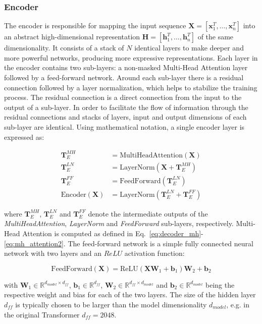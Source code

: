 \subsubsection{Encoder}
The encoder is responsible for mapping the input sequence $\bm{X} = [\bm{x}_1^T,
\ldots, \bm{x}_n^T]$ into an abstract high-dimensional representation $\bm{H} =
[\bm{h}_1^T, \ldots, \bm{h}_n^T]$ of the same dimensionality. It consists of a
stack of $N$ identical layers to make deeper and more powerful networks,
producing more expressive representations. Each layer in the encoder contains
two sub-layers: a non-masked Multi-Head Attention layer followed by a
feed-forward network. Around each sub-layer there is a residual connection
followed by a layer normalization, which helps to stabilize the training
process. The residual connection is a direct connection from the input to the
output of a sub-layer. In order to facilitate the flow of information through
the residual connections and stacks of layers, input and output dimensions of
each sub-layer are identical. Using mathematical notation, a single encoder
layer is expressed as:

\begin{align}
    \label{eq:encoder1}
    \bm{T}_E^{MH} &= \text{MultiHeadAttention}(\bm{X}) \\    
    \bm{T}_E^{LN} &= \text{LayerNorm}(\bm{X} + \bm{T}_E^{MH}) \\
    \bm{T}_E^{FF} &= \text{FeedForward}(\bm{T}_E^{LN}) \\
    \label{eq:encoder2}
    \text{Encoder}(\bm{X}) &= \text{LayerNorm}(\bm{T}_E^{LN} + \bm{T}_E^{FF})
\end{align}

where $\bm{T}_E^{MH}$, $\bm{T}_E^{LN}$ and $\bm{T}_E^{FF}$ denote the
intermediate outputs of the \textit{MultiHeadAttention}, \textit{LayerNorm} and
\textit{FeedForward} sub-layers, respectively. Multi-Head Attention is computed
as defined in Eq.~\ref{eq:decoder_mh}-\ref{eq:mh_attention2}. The feed-forward
network is a simple fully connected neural network with two layers and an $ReLU$
activation function:

\begin{equation}
    \text{FeedForward}(\bm{X}) = \text{ReLU}(\bm{X} \bm{W}_1 + \bm{b}_1) \bm{W}_2 + \bm{b}_2
\end{equation}

with $\bm{W}_1 \in \mathbb{R}^{d_{model} \times d_{ff}}$, $\bm{b}_1 \in
\mathbb{R}^{d_{ff}}$, $\bm{W}_2 \in \mathbb{R}^{d_{ff} \times d_{model}}$ and
$\bm{b}_2 \in \mathbb{R}^{d_{model}}$ being the respective weight and bias for
each of the two layers. The size of the hidden layer $d_{ff}$ is typically
chosen to be larger than the model dimensionality $d_{model}$, e.g. in the
original Transformer $d_{ff} = 2048$.

